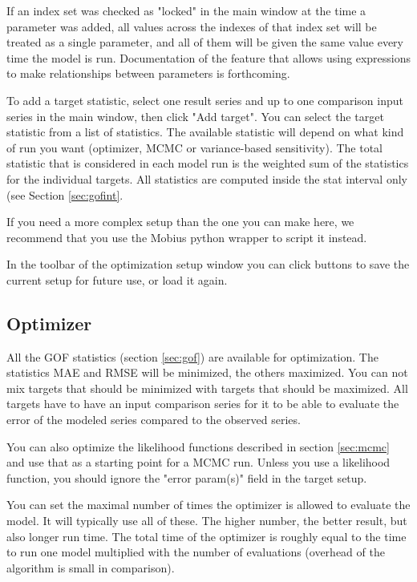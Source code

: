 \documentclass[11pt]{article}
\theoremstyle{definition}
\begin{document}
If an index set was checked as "locked" in the main window at the time a parameter was added, all values across the indexes of that index set will be treated as a single parameter, and all of them will be given the same value every time the model is run. Documentation of the feature that allows using expressions to make relationships between parameters is forthcoming.

To add a target statistic, select one result series and up to one comparison input series in the main window, then click "Add target". You can select the target statistic from a list of statistics. The available statistic will depend on what kind of run you want (optimizer, MCMC or variance-based sensitivity). The total statistic that is considered in each model run is the weighted sum of the statistics for the individual targets. All statistics are computed inside the stat interval only (see Section \ref{sec:gofint}.

If you need a more complex setup than the one you can make here, we recommend that you use the Mobius python wrapper to script it instead.

In the toolbar of the optimization setup window you can click buttons to save the current setup for future use, or load it again.

\subsection{Optimizer}
All the GOF statistics (section \ref{sec:gof}) are available for optimization. The statistics MAE and RMSE will be minimized, the others maximized. You can not mix targets that should be minimized with targets that should be maximized. All targets have to have an input comparison series for it to be able to evaluate the error of the modeled series compared to the observed series.

You can also optimize the likelihood functions described in section \ref{sec:mcmc} and use that as a starting point for a MCMC run. Unless you use a likelihood function, you should ignore the "error param(s)" field in the target setup.

You can set the maximal number of times the optimizer is allowed to evaluate the model. It will typically use all of these. The higher number, the better result, but also longer run time. The total time of the optimizer is roughly equal to the time to run one model multiplied with the number of evaluations (overhead of the algorithm is small in comparison).
\end{document}
